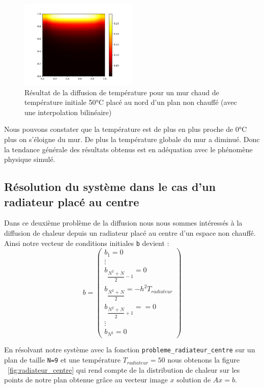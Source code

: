 \documentclass{article}
\begin{document}
\begin{figure}[htbp]
  \centering
  \includegraphics[width=0.5\textwidth]{images/mur_chaud.png}
  \caption{Résultat de la diffusion de température pour un mur chaud de température initiale 50°C placé au nord d'un plan non chauffé (avec une interpolation bilinéaire)}
  \label{fig:mur_chaud}
\end{figure}%

Nous pouvons constater que la température est de plus en plus proche de 0°C plus on s'éloigne du mur. De plus la température globale du mur a diminué. Donc la tendance générale des résultats obtenus est en adéquation avec le phénomène physique simulé.

\subsection{Résolution du système dans le cas d'un radiateur placé au centre}

Dans ce deuxième problème de la diffusion nous nous sommes intéressés à la diffusion de chaleur depuis un radiateur placé au centre d'un espace non chauffé. Ainsi notre vecteur de conditions initiales \texttt{b}  devient :
\begin{equation}\displaystyle{
  b=\begin{pmatrix} b_{1} = 0 \\ \vdots \\ b_{\dfrac{N^{2}+N}{2}-1} = 0 \\ b_{\dfrac{N^{2}+N}{2}} = -h^{2}T_{radiateur} \\
  b_{\dfrac{N^{2}+N}{2}+1} == 0 \\ \vdots \\ b_{N^{2}} = 0 \end{pmatrix}}
\end{equation}

En résolvant notre système avec la fonction \texttt{probleme\_radiateur\_centre} sur un plan de taille \texttt{N=9} et une température \texttt{$T_{radiateur}=50$} nous obtenons la figure ~\ref{fig:radiateur_centre} qui rend compte de la distribution de chaleur sur les points de notre plan obtenue grâce au vecteur image $x$ solution de $Ax=b$.
\end{document}
